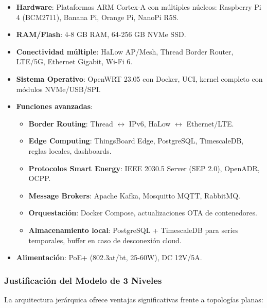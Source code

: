 \begin{itemize}
    \item \textbf{Hardware}: Plataformas ARM Cortex-A con múltiples núcleos: Raspberry Pi 4 (BCM2711), Banana Pi, Orange Pi, NanoPi R5S.
    \item \textbf{RAM/Flash}: 4-8 GB RAM, 64-256 GB NVMe SSD.
    \item \textbf{Conectividad múltiple}: HaLow AP/Mesh, Thread Border Router, LTE/5G, Ethernet Gigabit, Wi-Fi 6.
    \item \textbf{Sistema Operativo}: OpenWRT 23.05 con Docker, UCI, kernel completo con módulos NVMe/USB/SPI.
    \item \textbf{Funciones avanzadas}:
    \begin{itemize}
        \item \textbf{Border Routing}: Thread $\leftrightarrow$ IPv6, HaLow $\leftrightarrow$ Ethernet/LTE.
        \item \textbf{Edge Computing}: ThingsBoard Edge, PostgreSQL, TimescaleDB, reglas locales, dashboards.
        \item \textbf{Protocolos Smart Energy}: IEEE 2030.5 Server (SEP 2.0), OpenADR, OCPP.
        \item \textbf{Message Brokers}: Apache Kafka, Mosquitto MQTT, RabbitMQ.
        \item \textbf{Orquestación}: Docker Compose, actualizaciones OTA de contenedores.
        \item \textbf{Almacenamiento local}: PostgreSQL + TimescaleDB para series temporales, buffer en caso de desconexión cloud.
    \end{itemize}
    \item \textbf{Alimentación}: PoE+ (802.3at/bt, 25-60W), DC 12V/5A.
\end{itemize}

\subsubsection{Justificación del Modelo de 3 Niveles}

La arquitectura jerárquica ofrece ventajas significativas frente a topologías planas:

